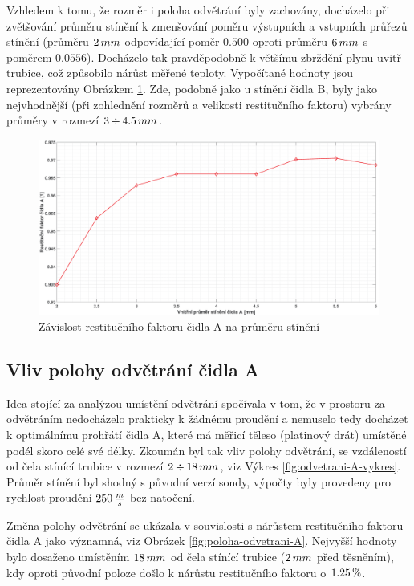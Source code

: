         \newpage
        Vzhledem k tomu, že rozměr i poloha odvětrání byly zachovány, docházelo při zvětšování průměru stínění k zmenšování poměru výstupních a vstupních průřezů stínění (průměru $2 \, mm$ odpovídající poměr $0.500$ oproti průměru $6 \, mm$ s poměrem $0.0556$). Docházelo tak pravděpodobně k většímu zbrždění plynu uvitř trubice, což způsobilo nárůst měřené teploty. Vypočítané hodnoty jsou reprezentovány Obrázkem \ref{fig:prumer-stineni-A}. Zde, podobně jako u stínění čidla B, byly jako nejvhodnější (při zohlednění rozměrů a velikosti restitučního faktoru) vybrány průměry v rozmezí $3 \div 4.5 \, mm$.
        
        \begin{figure}[ht!]
            \centering
            \includegraphics*[width=\textwidth]{400_SIMULACE_KONSTRUKCNICH_UPRAV/Grafy/05_prumer_stineni_A}
            \caption{Závislost restitučního faktoru čidla A na průměru stínění}
            \label{fig:prumer-stineni-A}
        \end{figure}
    
   \newpage
     \subsection{Vliv polohy odvětrání čidla A}
        Idea stojící za analýzou umístění odvětrání spočívala v tom, že v prostoru za odvětráním nedocházelo prakticky k žádnému proudění a nemuselo tedy docházet k optimálnímu prohřátí čidla A, které má měřicí těleso (platinový drát) umístěné podél skoro celé své délky. Zkoumán byl tak vliv polohy odvětrání, se vzdáleností od čela stínící trubice v rozmezí $2 \div 18 \, mm$, viz Výkres \ref{fig:odvetrani-A-vykres}. Průměr stínění byl shodný s původní verzí sondy, výpočty byly provedeny pro rychlost proudění $250 \, \frac{m}{s}$ bez natočení.

        Změna polohy odvětrání se ukázala v souvislosti s nárůstem restitučního faktoru čidla A jako významná, viz Obrázek \ref{fig:poloha-odvetrani-A}. Nejvyšší hodnoty bylo dosaženo umístěním $18 \, mm$ od čela stínící trubice ($2 \, mm$ před těsněním), kdy oproti původní poloze došlo k nárůstu restitučního faktoru o $1.25 \, \%$.
        
